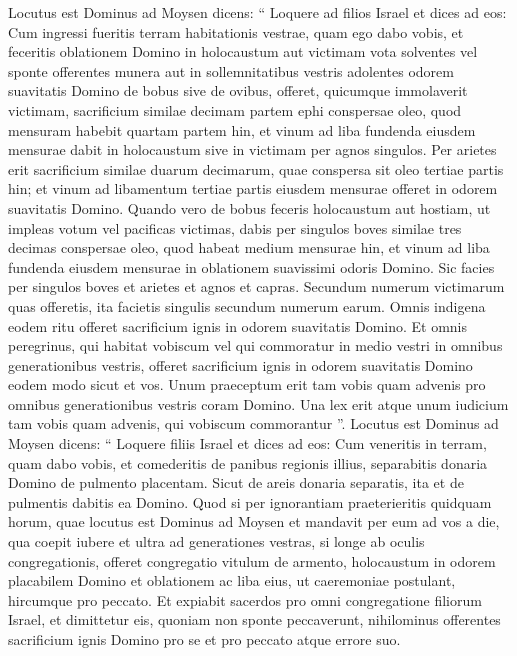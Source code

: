\begin{biblechapter}
\begin{biblechapter}
\begin{biblechapter}
\begin{biblechapter}
\begin{biblechapter}
\begin{biblechapter}
\begin{biblechapter}
\begin{biblechapter}
\begin{biblechapter}
\begin{biblechapter}
\begin{biblechapter}
\begin{biblechapter}
\begin{biblechapter}
\begin{biblechapter}
\begin{biblechapter}
\verse Locutus est Dominus ad Moysen dicens: 
\verse “ Loquere ad filios Israel et dices ad eos: Cum ingressi fueritis terram habitationis vestrae, quam ego dabo vobis, 
\verse et feceritis oblationem Domino in holocaustum aut victimam vota solventes vel sponte offerentes munera aut in sollemnitatibus vestris adolentes odorem suavitatis Domino de bobus sive de ovibus, 
\verse offeret, quicumque immolaverit victimam, sacrificium similae decimam partem ephi conspersae oleo, quod mensuram habebit quartam partem hin, 
\verse et vinum ad liba fundenda eiusdem mensurae dabit in holocaustum sive in victimam per agnos singulos. 
\verse Per arietes erit sacrificium similae duarum decimarum, quae conspersa sit oleo tertiae partis hin; 
\verse et vinum ad libamentum tertiae partis eiusdem mensurae offeret in odorem suavitatis Domino. 
\verse Quando vero de bobus feceris holocaustum aut hostiam, ut impleas votum vel pacificas victimas, 
\verse dabis per singulos boves similae tres decimas conspersae oleo, quod habeat medium mensurae hin, 
\verse et vinum ad liba fundenda eiusdem mensurae in oblationem suavissimi odoris Domino. 
\verse Sic facies per singulos boves et arietes et agnos et capras. 
\verse Secundum numerum victimarum quas offeretis, ita facietis singulis secundum numerum earum.
 \verse Omnis indigena eodem ritu offeret sacrificium ignis in odorem suavitatis Domino.
 \verse Et omnis peregrinus, qui habitat vobiscum vel qui commoratur in medio vestri in omnibus generationibus vestris, offeret sacrificium ignis in odorem suavitatis Domino eodem modo sicut et vos.
 \verse Unum praeceptum erit tam vobis quam advenis pro omnibus generationibus vestris coram Domino.
 \verse Una lex erit atque unum iudicium tam vobis quam advenis, qui vobiscum commorantur ”.
 \verse Locutus est Dominus ad Moysen dicens: 
\verse “ Loquere filiis Israel et dices ad eos: Cum veneritis in terram, quam dabo vobis, 
\verse et comederitis de panibus regionis illius, separabitis donaria Domino 
\verse de pulmento placentam. Sicut de areis donaria separatis, 
\verse ita et de pulmentis dabitis ea Domino.
 \verse Quod si per ignorantiam praeterieritis quidquam horum, quae locutus est Dominus ad Moysen 
\verse et mandavit per eum ad vos a die, qua coepit iubere et ultra ad generationes vestras, 
\verse si longe ab oculis congregationis, offeret congregatio vitulum de armento, holocaustum in odorem placabilem Domino et oblationem ac liba eius, ut caeremoniae postulant, hircumque pro peccato. 
\verse Et expiabit sacerdos pro omni congregatione filiorum Israel, et dimittetur eis, quoniam non sponte peccaverunt, nihilominus offerentes sacrificium ignis Domino pro se et pro peccato atque errore suo. 

\end{biblechapter}
\end{biblechapter}
\end{biblechapter}
\end{biblechapter}
\end{biblechapter}
\end{biblechapter}
\end{biblechapter}
\end{biblechapter}
\end{biblechapter}
\end{biblechapter}
\end{biblechapter}
\end{biblechapter}
\end{biblechapter}
\end{biblechapter}
\end{biblechapter}
